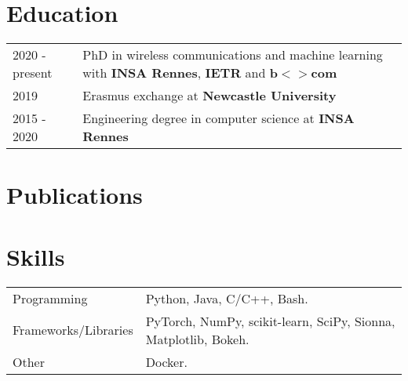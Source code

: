 \documentclass[a4paper,12pt]{article}
\begin{document}
\section{Education}
\begin{tabularx}{\linewidth}{@{}l X@{}}	
2020 - present & PhD in wireless communications and machine learning with \textbf{INSA Rennes}, \textbf{IETR} and \textbf{b$<>$com} \\

2019 & Erasmus exchange at \textbf{Newcastle University}\\

2015 - 2020 & Engineering degree in computer science at \textbf{INSA Rennes}\\
\end{tabularx}

\section{Publications}
\begin{refsection}
\nocite{*}
\printbibliography[heading=none]
\end{refsection}

\section{Skills}
\begin{tabularx}{\linewidth}{@{}l X@{}}
Programming &  \normalsize{Python, Java, C/C++, Bash.}\\
Frameworks/Libraries &  \normalsize{PyTorch, NumPy, scikit-learn, SciPy, Sionna, Matplotlib, Bokeh.}\\  
Other &  \normalsize{Docker.}
\end{tabularx}

\vfill
{}
\end{document}
